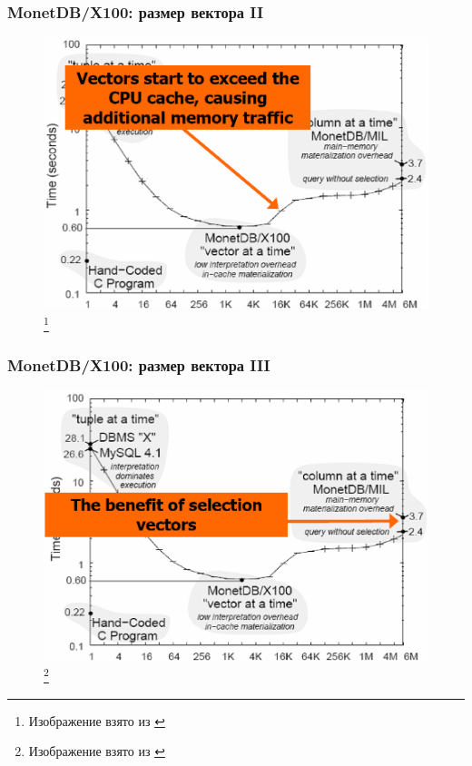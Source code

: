 \documentclass{beamer}
\begin{document}
\begin{frame}
\frametitle{MonetDB/X100: размер вектора II}

\begin{figure}[htb]
\includegraphics[width=\textwidth,height=0.750\textheight,keepaspectratio]{vecsize2.png} 
\footnote{\tiny{Изображение взято из \cite{Harizopoulos2009}}}
\end{figure}

\end{frame}

\begin{frame}
\frametitle{MonetDB/X100: размер вектора III}

\begin{figure}[htb]
\includegraphics[width=\textwidth,height=0.750\textheight,keepaspectratio]{vecsize3.png} 
\footnote{\tiny{Изображение взято из \cite{Harizopoulos2009}}}
\end{figure}

\end{frame}
\end{document}
